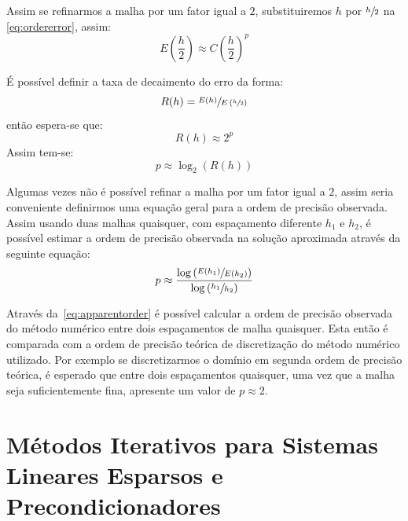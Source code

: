 \documentclass[
	12pt,				  %
	openright,		%
	twoside,			%
	a4paper,			%
	chapter=TITLE,		    %
	english,			%
	brazil				%
	]{abntex2}
\begin{document}
Assim se refinarmos a malha por um fator igual a $2$, substituiremos $h$ por
$\sfrac{h}{2}$ na \autoref{eq:ordererror}, assim:
\begin{equation}
    E{\left(\frac{h}{2}\right)} \approx C{\left(\frac{h}{2}\right)}^p
    \label{eq:halfordererror}
\end{equation}

É possível definir a taxa de decaimento do erro da forma:
\begin{equation}
    R(h) = \sfrac{E(h)}{E\left(\sfrac{h}{2}\right)}
\end{equation}
então espera-se que:
\begin{equation}
    R(h) \approx 2^p
\end{equation}
Assim tem-se:
\begin{equation}
    p \approx \log_2 (R(h))
\end{equation}

Algumas vezes não é possível refinar a malha por um fator igual a $2$, assim
seria conveniente definirmos uma equação geral para a ordem de precisão
observada. Assim usando duas malhas quaisquer, com espaçamento diferente $h_1$
e $h_2$, é possível estimar a ordem de precisão observada na solução aproximada
através da seguinte equação:
\begin{equation}
    p \approx
    \frac{\log\left(\sfrac{E(h_1)}{E(h_2)}\right)}
    {\log\left(\sfrac{h_1}{h_2}\right)}
    \label{eq:apparentorder}
\end{equation}

Através da~\autoref{eq:apparentorder} é possível calcular a ordem de precisão
observada do método numérico entre dois espaçamentos de malha quaisquer. Esta
então é comparada com a ordem de precisão teórica de discretização do método
numérico utilizado. Por exemplo se discretizarmos o domínio em segunda ordem de
precisão teórica, é esperado que entre dois espaçamentos quaisquer, uma vez que
a malha seja suficientemente fina, apresente um valor de $p \approx 2$. 

\section{Métodos Iterativos para Sistemas Lineares Esparsos e
Precondicionadores}\label{chap:itermeth}
\end{document}
